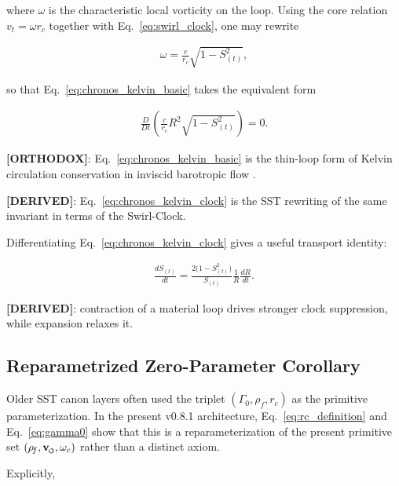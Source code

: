 \documentclass[11pt]{article}
\theoremstyle{definition}
\theoremstyle{plain}
\theoremstyle{remark}
\newcommand{\swirlarrow}{\mathchoice{\mkern-2mu\scriptstyle\boldsymbol{\circlearrowleft}}{\mkern-2mu\scriptstyle\boldsymbol{\circlearrowleft}}{\mkern-2mu\scriptscriptstyle\boldsymbol{\circlearrowleft}}{\mkern-2mu\scriptscriptstyle\boldsymbol{\circlearrowleft}}}
\newcommand{\vswirl}{\mathbf{v}_{\swirlarrow}}
\newcommand{\rhoF}{{\rho_{\!f}}}
\newcommand{\rc}{{r_c}}
\begin{document}
        where $\omega$ is the characteristic local vorticity on the loop. Using the core relation $v_t = \omega \rc$ together with Eq.~\eqref{eq:swirl_clock}, one may rewrite

        \begin{align}
            \omega = \frac{c}{\rc}\sqrt{1-S_{(t)}^2},
        \end{align}

        so that Eq.~\eqref{eq:chronos_kelvin_basic} takes the equivalent form

        \begin{align}
            \frac{D}{Dt}\left(\frac{c}{\rc} R^2 \sqrt{1-S_{(t)}^2}\right) = 0.
            \label{eq:chronos_kelvin_clock}
        \end{align}

        \textbf{[ORTHODOX]}: Eq.~\eqref{eq:chronos_kelvin_basic} is the thin-loop form of Kelvin circulation conservation in inviscid barotropic flow \cite{Batchelor1967,Saffman1992}.

        \textbf{[DERIVED]}: Eq.~\eqref{eq:chronos_kelvin_clock} is the SST rewriting of the same invariant in terms of the Swirl-Clock.

        Differentiating Eq.~\eqref{eq:chronos_kelvin_clock} gives a useful transport identity:

        \begin{align}
            \frac{dS_{(t)}}{dt}
            =
            \frac{2\bigl(1-S_{(t)}^2\bigr)}{S_{(t)}}
            \frac{1}{R}\frac{dR}{dt}.
            \label{eq:clock_radius_transport}
        \end{align}

        \textbf{[DERIVED]}: contraction of a material loop drives stronger clock suppression, while expansion relaxes it.

    \subsection{Reparametrized Zero-Parameter Corollary}
        \label{subsec:zero_parameter_corollary}

        Older SST canon layers often used the triplet $(\Gamma_0,\rhoF,\rc)$ as the primitive parameterization. In the present v0.8.1 architecture, Eq.~\eqref{eq:rc_definition} and Eq.~\eqref{eq:gamma0} show that this is a reparameterization of the present primitive set $(\rhoF,\vswirl,\omega_c)$ rather than a distinct axiom.

        Explicitly,
\end{document}
